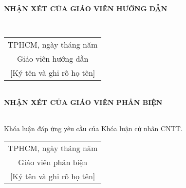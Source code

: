 \documentclass[class=article, crop=false]{standalone}
\newcounter{ct}
\begin{document}
	\thisfancypage{%
		\fbox
	}{}
	\thispagestyle{empty}
	\begin{center}
		\leavevmode \\
		\fontsize{12pt}{14.4pt}\selectfont\bfseries
		NHẬN XÉT CỦA GIÁO VIÊN HƯỚNG DẪN \\[\baselineskip]
	\end{center}
	\setlength{\parindent}{0.2cm}
	\fontsize{13pt}{17pt}\selectfont\rmfamily
	\par\makebox[15cm]{\dotfill}\\
	\begin{flushright}
		\begin{tabular}{c}
			TPHCM, ngày\makebox[1cm]{\dotfill}
			tháng\makebox[1cm]{\dotfill}
			năm\makebox[1cm]{\dotfill} \\
			Giáo viên hướng dẫn \\

			[Ký tên và ghi rõ họ tên]
		\end{tabular}		
	\end{flushright}
	\newpage
	\thisfancypage{%
		\fbox
	}{}
	\thispagestyle{empty}
	\begin{center}
		\leavevmode \\
		\fontsize{12pt}{14.4pt}\selectfont\bfseries
		NHẬN XÉT CỦA GIÁO VIÊN PHẢN BIỆN \\[\baselineskip]
	\end{center}
	\setlength{\parindent}{0.2cm}
	\fontsize{13pt}{17pt}\selectfont\rmfamily
	\par\makebox[15cm]{\dotfill}\\
	\forloop{ct}{0}{\value{ct} < 26}{
		\indent\makebox[15cm]{\dotfill}\\
	}
	\indent Khóa luận đáp ứng yêu cầu của Khóa luận cử nhân CNTT.
	\begin{flushright}
		\begin{tabular}{c}
			TPHCM, ngày\makebox[1cm]{\dotfill}
			tháng\makebox[1cm]{\dotfill}
			năm\makebox[1cm]{\dotfill} \\
			Giáo viên phản biện \\

			[Ký tên và ghi rõ họ tên]
		\end{tabular}		
	\end{flushright}
\end{document}
